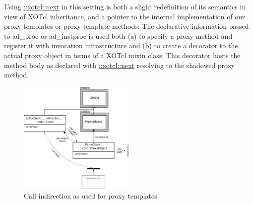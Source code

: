 % 
Using \href{http://media.wu-wien.ac.at/doc/tutorial.html#class_method_chaining}{::xotcl::next} in this setting is both a slight redefinition of its semantics in view of XOTcl inheritance, 
and a pointer to the internal implementation of our proxy templates or proxy template methods: The 
declarative information passed to ad\_proc or ad\_instproc is used both (a) to specify a proxy method 
and register it with invocation infrastructure and (b) to create a decorator to the actual proxy object in 
terms of a XOTcl mixin class. This decorator hosts the method body as declared with \href{http://media.wu-wien.ac.at/doc/tutorial.html#class_method_chaining}{::xotcl::next} 
resolving to the shadowed proxy method.

\begin{figure}[htbp]
\begin{center}
\includegraphics[width=0.5\textwidth]{img/proxy-template.png}
\caption{Call indirection as used for proxy templates}
\label{fig:advanced:templates:1}
\end{center}
\end{figure}

